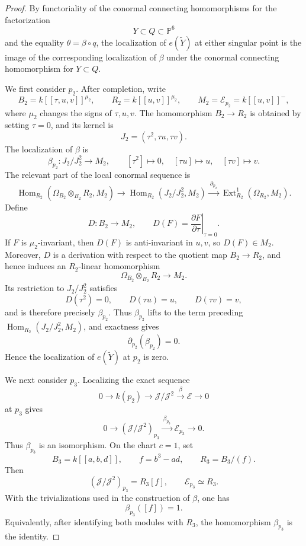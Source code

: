 \documentclass[11pt,twoside]{amsart}
\theoremstyle{plain}
\numberwithin{equation}{section}
\theoremstyle{definition}
\begin{document}
\begin{proof}
By functoriality of the conormal connecting homomorphisms for the factorization
$$
Y\subset Q\subset\mathbb P^6
$$
and the equality $\theta=\beta\circ q$, the localization of $e(\widetilde Y)$ at either singular point is the image of the corresponding localization of $\beta$ under the conormal connecting homomorphism for $Y\subset Q$.

We first consider $p_2$. After completion, write
$$
B_2=k[[\tau,u,v]]^{\mu_2},
\qquad
R_2=k[[u,v]]^{\mu_2},
\qquad
M_2=\mathcal E_{p_2}=k[[u,v]]^{-},
$$
where $\mu_2$ changes the signs of $\tau,u,v$. The homomorphism $B_2\to R_2$ is obtained by setting $\tau=0$, and its kernel is
$$
J_2=(\tau^2,\tau u,\tau v).
$$
The localization of $\beta$ is
$$
\beta_{p_2}:J_2/J_2^2\longrightarrow M_2,
\qquad
[\tau^2]\longmapsto0,\quad
[\tau u]\longmapsto u,\quad
[\tau v]\longmapsto v.
$$
The relevant part of the local conormal sequence is
$$
\operatorname{Hom}_{R_2}
   (\Omega_{B_2}\otimes_{B_2}R_2,M_2)
\longrightarrow
\operatorname{Hom}_{R_2}(J_2/J_2^2,M_2)
\xrightarrow{\ \partial_{p_2}\ }
\operatorname{Ext}^1_{R_2}(\Omega_{R_2},M_2).
$$
Define
$$
D:B_2\longrightarrow M_2,
\qquad
D(F)=
\left.\frac{\partial F}{\partial\tau}\right|_{\tau=0}.
$$
If $F$ is $\mu_2$-invariant, then $D(F)$ is anti-invariant in $u,v$, so $D(F)\in M_2$. Moreover, $D$ is a derivation with respect to the quotient map $B_2\to R_2$, and hence induces an $R_2$-linear homomorphism
$$
\Omega_{B_2}\otimes_{B_2}R_2\longrightarrow M_2.
$$
Its restriction to $J_2/J_2^2$ satisfies
$$
D(\tau^2)=0,\qquad
D(\tau u)=u,\qquad
D(\tau v)=v,
$$
and is therefore precisely $\beta_{p_2}$. Thus $\beta_{p_2}$ lifts to the term preceding $\operatorname{Hom}_{R_2}(J_2/J_2^2,M_2)$, and exactness gives
$$
\partial_{p_2}(\beta_{p_2})=0.
$$
Hence the localization of $e(\widetilde Y)$ at $p_2$ is zero.

We next consider $p_3$. Localizing the exact sequence
$$
0\longrightarrow k(p_2)
\longrightarrow\mathcal J/\mathcal J^2
\xrightarrow{\ \beta\ }\mathcal E
\longrightarrow0
$$
at $p_3$ gives
$$
0\longrightarrow
(\mathcal J/\mathcal J^2)_{p_3}
\xrightarrow{\ \beta_{p_3}\ }
\mathcal E_{p_3}
\longrightarrow0.
$$
Thus $\beta_{p_3}$ is an isomorphism. On the chart $c=1$, set
$$
B_3=k[[a,b,d]],
\qquad
f=b^3-ad,
\qquad
R_3=B_3/(f).
$$
Then
$$
(\mathcal J/\mathcal J^2)_{p_3}=R_3[f],
\qquad
\mathcal E_{p_3}\simeq R_3.
$$
With the trivializations used in the construction of $\beta$, one has
$$
\beta_{p_3}([f])=1.
$$
Equivalently, after identifying both modules with $R_3$, the homomorphism $\beta_{p_3}$ is the identity.


\end{proof}
\end{document}
